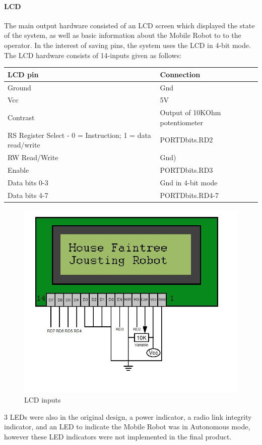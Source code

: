 \documentclass[11pt,a4paper]{article}
\begin{document}
      \paragraph{LCD}
      The main output hardware consisted of an LCD screen which displayed the state of the system, as well as basic information about the Mobile Robot to to the operator. In the interest of saving pins, the system uses the LCD in 4-bit mode.
      The LCD hardware consists of 14-inputs given as follows:
      \begin{table}[h]
        \begin{tabular}{|p{6cm}|p{5cm}|}
          \hline \textbf{LCD pin} & \textbf{Connection}\\
        	\hline Ground & Gnd\\
        	\hline Vcc & 5V\\
        	\hline Contrast & Output of 10KOhm potentiometer\\
        	\hline RS Register Select - 0 = Instruction; 1 = data read/write & PORTDbits.RD2\\
        	\hline RW Read/Write  & Gnd)\\
        	\hline Enable & PORTDbits.RD3\\
        	\hline Data bits 0-3 & Gnd in 4-bit mode\\
        	\hline Data bits 4-7 & PORTDbits.RD4-7\\
          \hline
        \end{tabular}
      \end{table}
      \begin{figure}[h!]
      	\includegraphics[scale=0.6]{LCD.jpg}
      	\centering
      	\caption{LCD inputs}
      \end{figure}
      3 LEDs were also in the original design, a power indicator, a radio link integrity indicator, and an LED to indicate the Mobile Robot was in Autonomous mode, however these LED indicators were not implemented in the final product.
      \pagebreak
\end{document}
